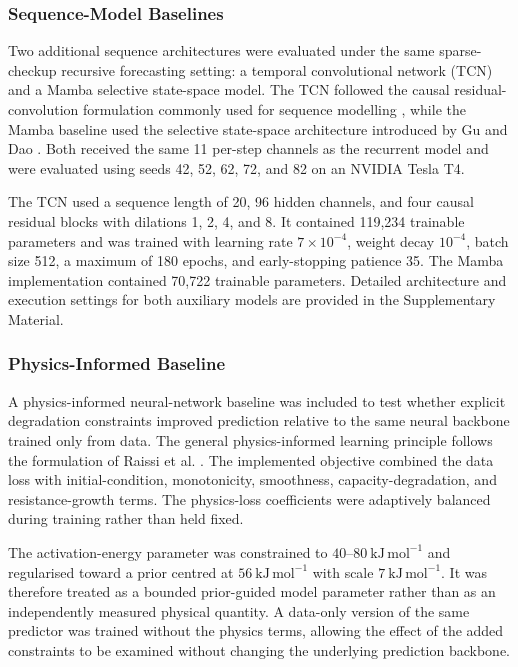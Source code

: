 \documentclass[a4paper,fleqn]{cas-sc}
\begin{document}
\subsubsection{Sequence-Model Baselines}
\label{sec:sequence_baselines_protocol}

Two additional sequence architectures were evaluated under the same
sparse-checkup recursive forecasting setting: a temporal convolutional
network (TCN) and a Mamba selective state-space model. The TCN followed the
causal residual-convolution formulation commonly used for sequence modelling
\cite{bai2018tcn}, while the Mamba baseline used the selective state-space
architecture introduced by Gu and Dao \cite{gu2023mamba}. Both received the
same 11 per-step channels as the recurrent model and were evaluated using
seeds 42, 52, 62, 72, and 82 on an NVIDIA Tesla T4.

The TCN used a sequence length of 20, 96 hidden channels, and four causal
residual blocks with dilations 1, 2, 4, and 8. It contained 119,234 trainable
parameters and was trained with learning rate $7\times10^{-4}$, weight decay
$10^{-4}$, batch size 512, a maximum of 180 epochs, and early-stopping
patience 35. The Mamba implementation contained 70,722 trainable parameters.
Detailed architecture and execution settings for both auxiliary models are
provided in the Supplementary Material.

\subsubsection{Physics-Informed Baseline}
\label{sec:pinn_protocol}

A physics-informed neural-network baseline was included to test whether explicit degradation constraints improved prediction relative to the same neural backbone trained only from data. The general physics-informed learning principle follows the formulation of Raissi et al. \cite{raissi2019pinn}. The implemented objective combined the data loss with initial-condition, monotonicity, smoothness, capacity-degradation, and resistance-growth terms. The physics-loss coefficients were adaptively balanced during training rather than held fixed.

The activation-energy parameter was constrained to \(40\text{--}80~\mathrm{kJ\,mol^{-1}}\) and regularised toward a prior centred at \(56~\mathrm{kJ\,mol^{-1}}\) with scale \(7~\mathrm{kJ\,mol^{-1}}\). It was therefore treated as a bounded prior-guided model parameter rather than as an independently measured physical quantity. A data-only version of the same predictor was trained without the physics terms, allowing the effect of the added constraints to be examined without changing the underlying prediction backbone.
\end{document}
